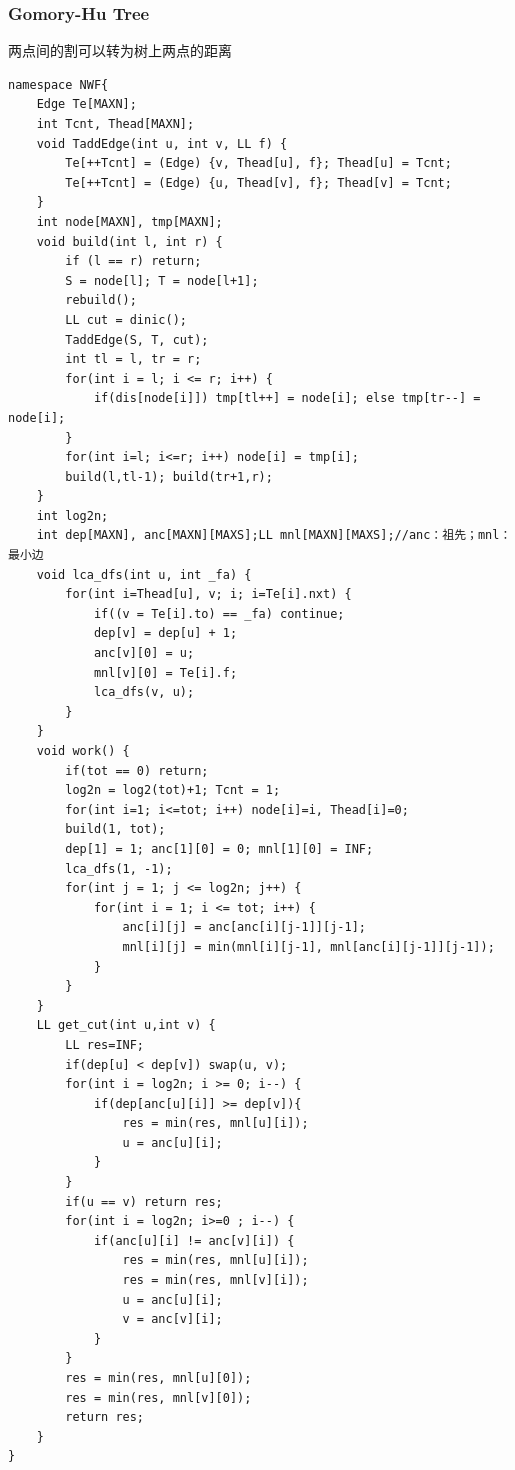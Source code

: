 \documentclass[10pt]{ctexart}
\begin{document}
{\subsubsection{Gomory-Hu Tree}
两点间的割可以转为树上两点的距离
\begin{lstlisting}
namespace NWF{
    Edge Te[MAXN];
    int Tcnt, Thead[MAXN];
    void TaddEdge(int u, int v, LL f) {
        Te[++Tcnt] = (Edge) {v, Thead[u], f}; Thead[u] = Tcnt;
        Te[++Tcnt] = (Edge) {u, Thead[v], f}; Thead[v] = Tcnt;
    }
    int node[MAXN], tmp[MAXN];
    void build(int l, int r) {
        if (l == r) return;
        S = node[l]; T = node[l+1];
        rebuild();
        LL cut = dinic();
        TaddEdge(S, T, cut);
        int tl = l, tr = r;
        for(int i = l; i <= r; i++) {
            if(dis[node[i]]) tmp[tl++] = node[i]; else tmp[tr--] = node[i];
        }
        for(int i=l; i<=r; i++) node[i] = tmp[i];
        build(l,tl-1); build(tr+1,r);
    }
    int log2n;
    int dep[MAXN], anc[MAXN][MAXS];LL mnl[MAXN][MAXS];//anc：祖先；mnl：最小边
    void lca_dfs(int u, int _fa) {
        for(int i=Thead[u], v; i; i=Te[i].nxt) {
            if((v = Te[i].to) == _fa) continue;
            dep[v] = dep[u] + 1;
            anc[v][0] = u;
            mnl[v][0] = Te[i].f;
            lca_dfs(v, u);
        }
    }
    void work() {
        if(tot == 0) return;
        log2n = log2(tot)+1; Tcnt = 1;
        for(int i=1; i<=tot; i++) node[i]=i, Thead[i]=0;
        build(1, tot);
        dep[1] = 1; anc[1][0] = 0; mnl[1][0] = INF;
        lca_dfs(1, -1);
        for(int j = 1; j <= log2n; j++) {
            for(int i = 1; i <= tot; i++) {
                anc[i][j] = anc[anc[i][j-1]][j-1];
                mnl[i][j] = min(mnl[i][j-1], mnl[anc[i][j-1]][j-1]);
            }
        }
    }
    LL get_cut(int u,int v) {
        LL res=INF;
        if(dep[u] < dep[v]) swap(u, v);
        for(int i = log2n; i >= 0; i--) {
            if(dep[anc[u][i]] >= dep[v]){
                res = min(res, mnl[u][i]);
                u = anc[u][i];
            }
        }
        if(u == v) return res;
        for(int i = log2n; i>=0 ; i--) {
            if(anc[u][i] != anc[v][i]) {
                res = min(res, mnl[u][i]);
                res = min(res, mnl[v][i]);
                u = anc[u][i];
                v = anc[v][i];
            }
        }
        res = min(res, mnl[u][0]);
        res = min(res, mnl[v][0]);
        return res;
    }
}
\end{lstlisting}
}
\end{document}
